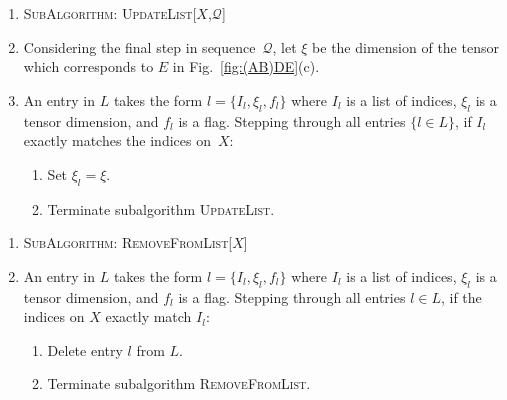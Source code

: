 \documentclass[aps,pre,reprint,superscriptaddress,amsfonts,amsmath,showpacs,nofootinbib,floatfix]{revtex4-1}
\newcommand{\mc}[1]{\mathcal{#1}}
\newcommand{\fref}[1]{Fig.~\ref{#1}}
\begin{document}
\begin{enumerate}
\item[] $\!\!\!\!\!\!\!$\textsc{SubAlgorithm: UpdateList[$X$,$\mc{Q}$]}
\item \rule{0pt}{3.7ex}Considering the final step in sequence~$\mc{Q}$, let $\xi$ be the dimension of the tensor which corresponds to $E$ in \fref{fig:(AB)DE}(c).
\item An entry in $L$ takes the form $l=\{I_l,\xi_l,f_l\}$ where $I_l$ is a list of indices, $\xi_l$ is a tensor dimension, and $f_l$ is a flag. Stepping through all entries $\{l\in L\}$, if $I_l$ exactly matches the indices on~$X$:
\begin{enumerate}
\item Set $\xi_l=\xi$.
\item Terminate subalgorithm \textsc{UpdateList}.
\end{enumerate}
\end{enumerate}
\begin{enumerate}
\item[] $\!\!\!\!\!\!\!$\textsc{SubAlgorithm: RemoveFromList[$X$]}
\item \rule{0pt}{3.7ex}An entry in $L$ takes the form $l=\{I_l,\xi_l,f_l\}$ where $I_l$ is a list of indices, $\xi_l$ is a tensor dimension, and $f_l$ is a flag. Stepping through all entries $l\in L$, if the indices on $X$ exactly match $I_l$:
\begin{enumerate}
\item Delete entry $l$ from $L$.
\item Terminate subalgorithm \textsc{RemoveFromList}.
\end{enumerate}
\end{enumerate}
\end{document}
